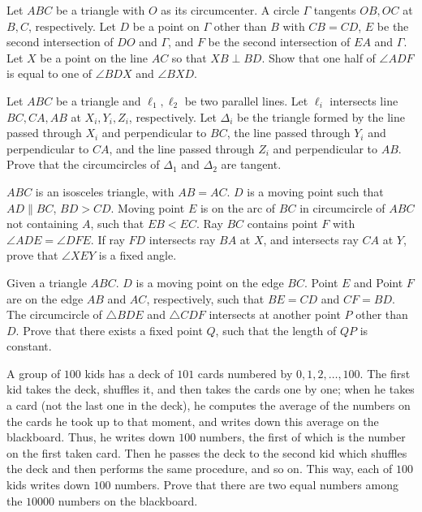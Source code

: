 \documentclass[11pt]{scrartcl}
\begin{document}
\begin{problem}[537574018594693]
Let $ABC$ be a triangle with $O$ as its circumcenter. A circle $\Gamma$ tangents $OB, OC$ at $B, C$, respectively. Let $D$ be a point on $\Gamma$ other than $B$ with $CB=CD$, $E$ be the second intersection of $DO$ and $\Gamma$, and $F$ be the second intersection of $EA$ and $\Gamma$. Let $X$ be a point on the line $AC$ so that $XB\perp BD$. Show that one half of $\angle ADF$ is equal to one of $\angle BDX$ and $\angle BXD$.
\end{problem}
\begin{problem}[4992489807901310938]
Let $ABC$ be a triangle and $\ell_1,\ell_2$ be two parallel lines. Let $\ell_i$ intersects line $BC,CA,AB$ at $X_i,Y_i,Z_i$, respectively. Let $\Delta_i$ be the triangle formed by the line passed through $X_i$ and perpendicular to $BC$, the line passed through $Y_i$ and perpendicular to $CA$, and the line passed through $Z_i$ and perpendicular to $AB$. Prove that the circumcircles of $\Delta_1$ and $\Delta_2$ are tangent.
\end{problem}
\begin{problem}[215375559035207]
$ABC$ is an isosceles triangle, with $AB=AC$. $D$ is a moving point such that $AD\parallel BC$, $BD>CD$. Moving point $E$ is on the arc of $BC$ in circumcircle of $ABC$ not containing $A$, such that $EB<EC$. Ray $BC$ contains point $F$ with $\angle ADE=\angle DFE$. If ray $FD$ intersects ray $BA$ at $X$, and intersects ray $CA$ at $Y$, prove that $\angle XEY$ is a fixed angle.
\end{problem}
\begin{problem}[117986541208663]
Given a triangle $ABC$. $D$ is a moving point on the edge $BC$. Point $E$ and Point $F$ are on the edge $AB$ and $AC$, respectively, such that $BE=CD$ and $CF=BD$. The circumcircle of $\triangle BDE$ and $\triangle CDF$ intersects at another point $P$ other than $D$. Prove that there exists a fixed point $Q$, such that the length of $QP$ is constant.
\end{problem}
\begin{problem}[4000488814786935591]
A group of $100$ kids has a deck of $101$ cards numbered by $0, 1, 2,\dots, 100$. The first kid takes the deck, shuffles it, and then takes the cards one by one; when he takes a card (not the last one in the deck), he computes the average of the numbers on the cards he took up to that moment, and writes down this average on the blackboard. Thus, he writes down $100$ numbers, the first of which is the number on the first taken card. Then he passes the deck to the second kid which shuffles the deck and then performs the same procedure, and so on. This way, each of $100$ kids writes down $100$ numbers. Prove that there are two equal numbers among the $10000$ numbers on the blackboard.
\end{problem}
\end{document}
